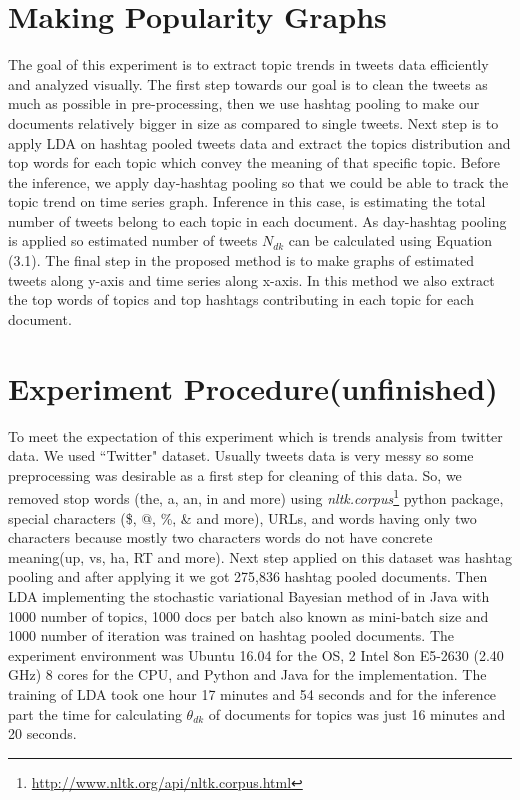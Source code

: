 \section{Making Popularity Graphs}
The goal of this experiment is to extract topic trends in tweets data efficiently and analyzed visually. The first step towards our goal is to clean the tweets as much as possible in pre-processing, then we use hashtag pooling to make our documents relatively bigger in size as compared to single tweets. Next step is to apply LDA on hashtag pooled tweets data and extract the topics distribution and top words for each topic which convey the meaning of that specific topic. Before the inference, we apply day-hashtag pooling so that we could be able to track the topic trend on time series graph. Inference in this case, is estimating the total number of tweets belong to each topic in each document. As day-hashtag pooling is applied so estimated number of tweets $N_{dk}$ can be calculated using Equation (3.1). The final step in the proposed method is to make graphs of estimated tweets along y-axis and time series along x-axis. In this method we also extract the top words of topics and top hashtags contributing in each topic for each document.

\section{Experiment Procedure(unfinished) }
To meet the expectation of this experiment which is trends analysis from twitter data. We used ``Twitter" dataset. Usually tweets data is very messy so some preprocessing was desirable as a first step for cleaning of this data. So, we removed stop words (the, a, an, in and more) using \textit{nltk.corpus}\footnote{\url{http://www.nltk.org/api/nltk.corpus.html}} python package, special characters (\$, @, \%, \& and more), URLs, and words having only two characters because mostly two characters words do not have concrete meaning(up, vs, ha, RT and more). Next step applied on this dataset was hashtag pooling and after applying it we got 275,836 hashtag pooled documents. Then LDA implementing the stochastic variational Bayesian method of \cite{mimno2012sparse} in Java with 1000 number of topics, 1000 docs per batch also known as mini-batch size and 1000 number of iteration was trained on hashtag pooled documents. The experiment environment was Ubuntu 16.04 for the OS, 2 Intel 8on E5-2630 (2.40 GHz) 8 cores for the CPU, and Python and Java for the implementation. The training of LDA took one hour 17 minutes and 54 seconds and for the inference part the time for calculating $\theta_{dk}$ of documents for topics was just 16 minutes and 20 seconds.